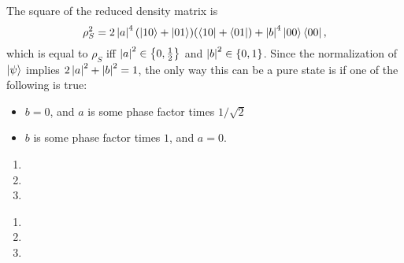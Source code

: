 \documentclass{article}
\begin{document}
\begin{enumerate}[label=(\alph*)]
        The square of the reduced density matrix is 
        \[ \rho_S^2 = 2 \left\lvert a \right\rvert^4 ( \left\lvert 10 \right\rangle + \left\lvert 01 \right\rangle) (\left\langle 10 \right\rvert + \left\langle 01 \right\rvert) + \left\lvert b \right\rvert^4 \left\lvert 00 \right\rangle\left\langle 00 \right\rvert, \]
        which is equal to $\rho_S$ iff $\left\lvert a \right\rvert^2 \in \left\{ 0, \frac{1}{2} \right\}$ and $\left\lvert b \right\rvert^2 \in \left\{ 0, 1 \right\}$. Since the normalization of $\left\lvert \psi \right\rangle$ implies $2\left\lvert a \right\rvert^2 + \left\lvert b \right\rvert^2=1$, the only way this can be a pure state is if one of the following is true:
        \begin{itemize}
            \item $b=0$, and $a$ is some phase factor times $1/\sqrt{2}$
            \item $b$ is some phase factor times $1$, and $a=0$.
        \end{itemize}
\end{enumerate}


\bigskip
\begin{prob}
\end{prob}
\begin{enumerate}[label=(\alph*)]
    \item
    \item
    \item
\end{enumerate}


\bigskip
\begin{prob}
\end{prob}
\begin{enumerate}[label=(\alph*)]
    \item
    \item
    \item
\end{enumerate}



\end{document}
